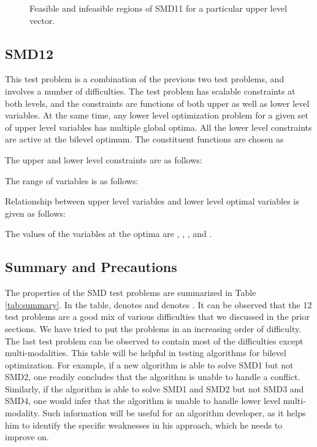 \documentclass[twoside]{article}
\begin{document}
\begin{figure}
\begin{center}
\caption{Feasible and infeasible regions of SMD11 for a particular upper level vector.}
\label{fig:smd11}
\end{center}
\end{figure}

\subsection{SMD12}
This test problem is a combination of the previous two test problems, and involves a number of difficulties. The test problem has scalable constraints at both levels, and the constraints are functions of both upper as well as lower level variables. At the same time, any lower level optimization problem for a given set of upper level variables has multiple global optima. All the lower level constraints are active at the bilevel optimum. The constituent functions are chosen as

The upper and lower level constraints are as follows:

The range of variables is as follows:

Relationship between upper level variables and lower level optimal variables is given as follows:

The values of the variables at the optima are , , , and . 

\subsection{Summary and Precautions}
The properties of the SMD test problems are summarized in Table \ref{tab:summary}. In the table,  denotes  and  denotes . It can be observed that the 12 test problems are a good mix of various difficulties that we discussed in the prior sections. We have tried to put the problems in an increasing order of difficulty. The last test problem can be observed to contain most of the difficulties except multi-modalities. This table will be helpful in testing algorithms for bilevel optimization. For example, if a new algorithm is able to solve SMD1 but not SMD2, one readily concludes that the algorithm is unable to handle a conflict. Similarly, if the algorithm is able to solve SMD1 and SMD2 but not SMD3 and SMD4, one would infer that the algorithm is unable to handle lower level multi-modality. Such information will be useful for an algorithm developer, as it helps him to identify the specific weaknesses in his approach, which he needs to improve on.
\end{document}
